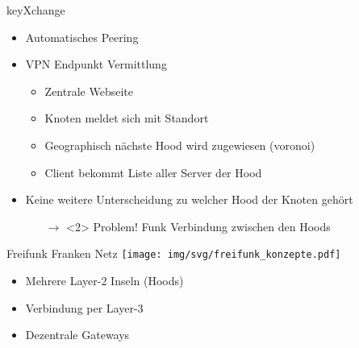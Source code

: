 \begin{frame}{keyXchange}
    \begin{itemize}
        \item \glqq{}Automatisches Peering\grqq{}
        \item VPN Endpunkt Vermittlung
        \begin{itemize}
            \item Zentrale Webseite 
            \item Knoten meldet sich mit Standort
            \item Geographisch nächste Hood wird zugewiesen (voronoi)
            \item Client bekommt Liste aller Server der Hood
        \end{itemize}
        \item Keine weitere Unterscheidung zu welcher Hood der Knoten gehört
        \begin{itemize}
            \item[$\rightarrow$]<2> {\color{red}Problem!} Funk Verbindung zwischen den Hoods
        \end{itemize}
    \end{itemize}
\end{frame}

\begin{frame}{Freifunk Franken Netz}
    \texttt{[image: img/svg/freifunk\_konzepte.pdf]}

    \begin{itemize}
        \item Mehrere Layer-2 Inseln (Hoods)
        \item Verbindung per Layer-3
        \item Dezentrale Gateways
    \end{itemize}
\end{frame}


